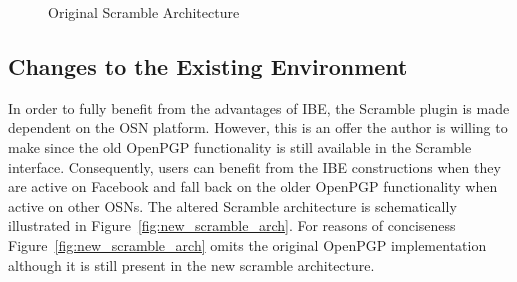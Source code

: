\begin{figure}
\begin{center}
{{
        }
    }
    \end{center}
    \caption{Original Scramble Architecture}
    \label{fig:original_scramble_arch}
\end{figure}

\subsection{Changes to the Existing Environment}
In order to fully benefit from the advantages of IBE, the Scramble plugin is made dependent on the OSN platform. However, this is an offer the author is willing to make since the old OpenPGP functionality is still available in the Scramble interface. Consequently, users can benefit from the IBE constructions when they are active on Facebook and fall back on the older OpenPGP functionality when active on other OSNs. The altered Scramble architecture is schematically illustrated in Figure~\ref{fig:new_scramble_arch}. For reasons of conciseness Figure~\ref{fig:new_scramble_arch} omits the original OpenPGP implementation although it is still present in the new scramble architecture.

